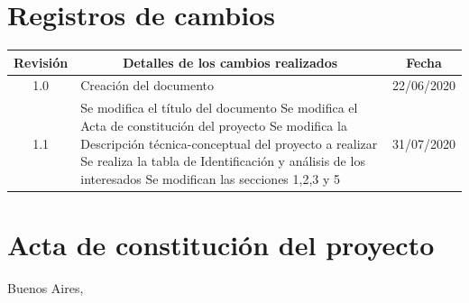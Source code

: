 \documentclass[11pt]{charter}
\begin{document}
\maketitle
\thispagestyle{empty}
\pagebreak


\thispagestyle{empty}
{\setlength{\parskip}{0pt}
\tableofcontents{}
}
\pagebreak


\section{Registros de cambios}
\label{sec:registro}


\begin{table}[ht]
\label{tab:registro}
\centering

\begin{tabularx}{\linewidth}{@{}|c|X|c|@{}}
\hline
\rowcolor[HTML]{C0C0C0} 
Revisión & \multicolumn{1}{c|}{\cellcolor[HTML]{C0C0C0}Detalles de los cambios realizados} & Fecha      \\ \hline
1.0      & Creación del documento                                                          & 22/06/2020 \\ \hline
1.1      & Se modifica el título del documento \newline                                                                                Se modifica el Acta de constitución del proyecto \newline                                                                               
Se modifica la Descripción técnica-conceptual del proyecto a realizar \newline                                                                               
Se realiza la tabla de Identificación y análisis de los interesados \newline                                                                               
Se modifican las secciones 1,2,3 y 5 
						& 31/07/2020 \\ \hline
\end{tabularx}
\end{table}

\pagebreak



\section{Acta de constitución del proyecto}
\label{sec:acta}

\begin{flushright}
Buenos Aires, \fechaInicioName
\end{flushright}
\end{document}
